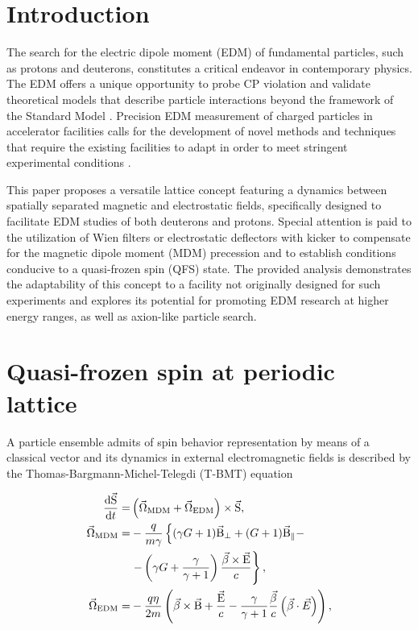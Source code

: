 \documentclass[submitting]{nst}
\begin{document}
\section{Introduction}\label{sec.I}
\par The search for the electric dipole moment (EDM) of fundamental particles, such as protons and deuterons, constitutes a critical endeavor in contemporary physics. The EDM offers a unique opportunity to probe CP violation and validate theoretical models that describe particle interactions beyond the framework of the Standard Model \cite{EDM, prec}. Precision EDM measurement of charged particles in accelerator facilities calls for the development of novel methods and techniques that require the existing facilities to adapt in order to meet stringent experimental conditions \cite{CPEDM}.

\par This paper proposes a versatile lattice concept featuring a dynamics between spatially separated magnetic and electrostatic fields, specifically designed to facilitate EDM studies of both deuterons and protons. Special attention is paid to the utilization of Wien filters or electrostatic deflectors with kicker to compensate for the magnetic dipole moment (MDM) precession and to establish conditions conducive to a quasi-frozen spin (QFS) state. The provided analysis demonstrates the adaptability of this concept to a facility not originally designed for such experiments and explores its potential for promoting EDM research at higher energy ranges, as well as axion-like particle search.
 
\section{Quasi-frozen spin at periodic lattice}\label{sec.II}

\par A particle ensemble admits of spin behavior representation by means of a classical vector and its dynamics in external electromagnetic fields is described by the Thomas-Bargmann-Michel-Telegdi (T-BMT) equation \cite{TBMT}

\begin{equation}
	\begin{aligned}
		\dv{\vec{\mathrm{S}}}{t} = & \left(\vec{\Omega}_{\text{MDM}}+\vec{\Omega}_{\text{EDM}}\right)\times\vec{\mathrm{S}}, \\
		\vec{\Omega}_{\text{MDM}}  = & - \frac{q}{m \gamma}\left\{(\gamma G+1) \vec{\mathrm{B}}_{\perp}+(G+1) \vec{\mathrm{B}}_{\|}-\right. \\
								     & \left.-\left(\gamma G+\frac{\gamma}{\gamma+1}\right) \frac{\vec{\beta} \times \vec{\mathrm{E}}}{c}\right\}, \\
		\vec{\Omega}_{\text{EDM}}  = & - \frac{q \eta}{2 m}\left(\vec{\beta} \times \vec{\mathrm{B}}+\frac{\vec{\mathrm{E}}}{c}-\frac{\gamma}{\gamma+1}\frac{\vec{\beta}}{c}\left(\vec{\beta}\cdot\vec{E}\right)\right),
	\end{aligned}
	\label{eq:T-BMT}
\end{equation}
\end{document}
